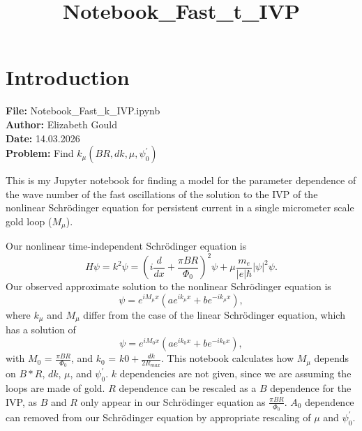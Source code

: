 \documentclass[11pt]{article}
\title{Notebook\_Fast\_t\_IVP}
\begin{document}
    
    \maketitle
    
    

    
    \hypertarget{introduction}{%
\section{Introduction}\label{introduction}}

    \textbf{File:} Notebook\_Fast\_k\_IVP.ipynb\\
\textbf{Author:} Elizabeth Gould\\
\textbf{Date:} 14.03.2026\\
\textbf{Problem:} Find
\(k_{\mu}\left(BR, dk, \mu, \psi_0^\prime\right)\)

    This is my Jupyter notebook for finding a model for the parameter
dependence of the wave number of the fast oscillations of the solution
to the IVP of the nonlinear Schrödinger equation for persistent current
in a single micrometer scale gold loop (\(M_{\mu}\)).

Our nonlinear time-independent Schrödinger equation is \begin{equation}
H \psi = k^2 \psi = \left( i \frac{d}{dx} + \frac{\pi BR}{\Phi_0} \right)^2 \psi + \mu \frac{m_e}{\left|e\right|\hbar} \left|\psi\right|^2 \psi.
\end{equation} Our observed approximate solution to the nonlinear
Schrödinger equation is \begin{equation}
\psi = e^{i M_{\mu} x} \left( a e^{i k_{\mu} x} + b e^{- i k_{\mu} x} \right),
\end{equation} where \(k_{\mu}\) and \(M_{\mu}\) differ from the case of
the linear Schrödinger equation, which has a solution of
\begin{equation}
\psi = e^{i M_0 x} \left( a e^{i k_0 x} + b e^{- i k_0 x} \right),
\end{equation} with \(M_{0}\) = \(\frac{\pi BR}{\Phi_0}\), and \(k_{0}\)
= \(k0 + \frac{dk}{2 R_{max} }\). This notebook calculates how
\(M_{\mu}\) depends on \(B * R\), \(dk\), \(\mu\), and
\(\psi^\prime_0\). \(k\) dependencies are not given, since we are
assuming the loops are made of gold. \(R\) dependence can be rescaled as
a \(B\) dependence for the IVP, as \(B\) and \(R\) only appear in our
Schrödinger equation as \(\frac{\pi BR}{\Phi_0}\). \(A_0\) dependence
can removed from our Schrödinger equation by appropriate rescaling of
\(\mu\) and \(\psi_0^\prime\).
\end{document}
